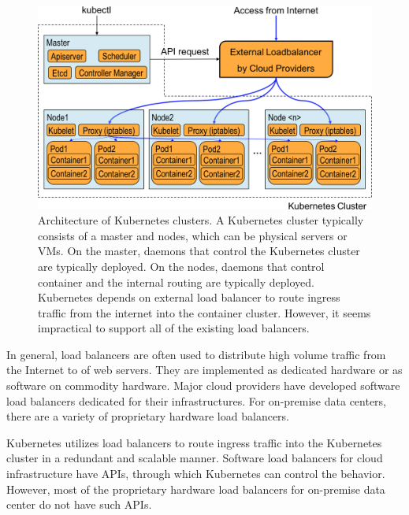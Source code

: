 \begin{figure}[h]
  \centering
  \includegraphics[width=0.8\columnwidth]{Figs/K8sConventional}
  
  \centering
  
  \begin{minipage}{0.9\columnwidth}
    \caption[Architecture of Kubernetes clusters]{
      Architecture of Kubernetes clusters.
      A Kubernetes cluster typically consists of a master and nodes, which can be physical servers or VMs.
      On the master, daemons that control the Kubernetes cluster are typically deployed. 
      On the nodes,  daemons that control container and the internal routing are typically deployed.
      Kubernetes depends on external load balancer to route ingress traffic from the internet into the container cluster.
      However, it seems impractical to support all of the existing load balancers.
    }
    \label{fig:k8s_intro}
  \end{minipage}
  
\end{figure}

In general, load balancers are often used to distribute high volume traffic from the Internet to  of web servers.
They are implemented as  dedicated hardware or as  software on commodity hardware.
Major cloud providers have developed software load balancers \cite{eisenbud2016maglev,patel2013ananta} dedicated for their infrastructures.
For on-premise data centers, there are a variety of proprietary hardware load balancers.

Kubernetes utilizes load balancers to route ingress traffic into the Kubernetes cluster in a redundant and scalable manner. 
Software load balancers for cloud infrastructure have APIs, through which Kubernetes can control the behavior.
However, most of the proprietary hardware load balancers for on-premise data center do not have such APIs.

